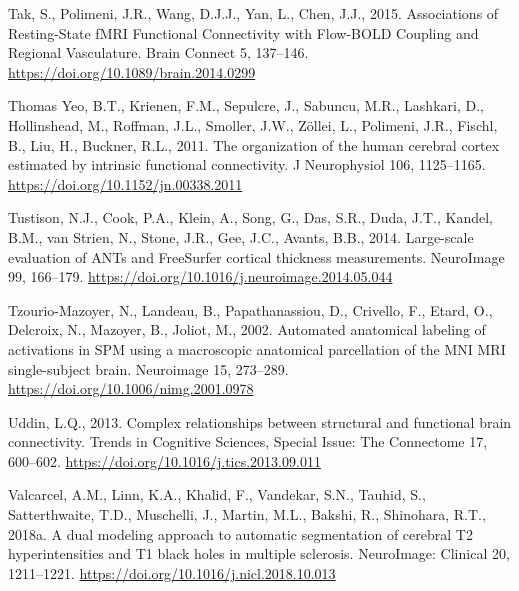 \documentclass[
  12pt,
]{article}
\newlength{\cslhangindent}
\newlength{\cslentryspacingunit} %
\newenvironment{CSLReferences}[2] %
 {%
  \setlength{\parindent}{0pt}
  \ifodd #1
  \let\oldpar\par
  \def\par{\hangindent=\cslhangindent\oldpar}
  \fi
  \setlength{\parskip}{#2\cslentryspacingunit}
 }%
 {}
\begin{document}
\begin{CSLReferences}{1}{0}
\leavevmode{}%
Tak, S., Polimeni, J.R., Wang, D.J.J., Yan, L., Chen, J.J., 2015. Associations of {Resting-State fMRI Functional Connectivity} with {Flow-BOLD Coupling} and {Regional Vasculature}. Brain Connect 5, 137--146. \url{https://doi.org/10.1089/brain.2014.0299}

\leavevmode{}%
Thomas Yeo, B.T., Krienen, F.M., Sepulcre, J., Sabuncu, M.R., Lashkari, D., Hollinshead, M., Roffman, J.L., Smoller, J.W., Zöllei, L., Polimeni, J.R., Fischl, B., Liu, H., Buckner, R.L., 2011. The organization of the human cerebral cortex estimated by intrinsic functional connectivity. J Neurophysiol 106, 1125--1165. \url{https://doi.org/10.1152/jn.00338.2011}

\leavevmode{}%
Tustison, N.J., Cook, P.A., Klein, A., Song, G., Das, S.R., Duda, J.T., Kandel, B.M., van Strien, N., Stone, J.R., Gee, J.C., Avants, B.B., 2014. Large-scale evaluation of {ANTs} and {FreeSurfer} cortical thickness measurements. NeuroImage 99, 166--179. \url{https://doi.org/10.1016/j.neuroimage.2014.05.044}

\leavevmode{}%
Tzourio-Mazoyer, N., Landeau, B., Papathanassiou, D., Crivello, F., Etard, O., Delcroix, N., Mazoyer, B., Joliot, M., 2002. Automated anatomical labeling of activations in {SPM} using a macroscopic anatomical parcellation of the {MNI MRI} single-subject brain. Neuroimage 15, 273--289. \url{https://doi.org/10.1006/nimg.2001.0978}

\leavevmode{}%
Uddin, L.Q., 2013. Complex relationships between structural and functional brain connectivity. Trends in Cognitive Sciences, Special {Issue}: {The Connectome} 17, 600--602. \url{https://doi.org/10.1016/j.tics.2013.09.011}

\leavevmode{}%
Valcarcel, A.M., Linn, K.A., Khalid, F., Vandekar, S.N., Tauhid, S., Satterthwaite, T.D., Muschelli, J., Martin, M.L., Bakshi, R., Shinohara, R.T., 2018a. A dual modeling approach to automatic segmentation of cerebral {T2} hyperintensities and {T1} black holes in multiple sclerosis. NeuroImage: Clinical 20, 1211--1221. \url{https://doi.org/10.1016/j.nicl.2018.10.013}


\end{CSLReferences}
\end{document}
